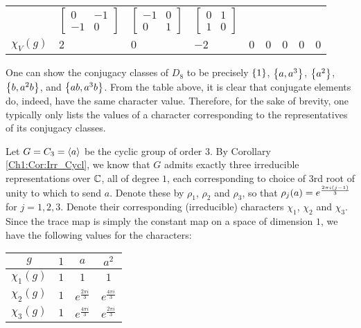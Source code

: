 \begin{boxexample}
\begin{table}[H]
\begin{tabular}{C{1.1cm}|C{1.1cm} C{1.38cm} C{1.67cm} C{1.38cm} C{1.38cm} C{1.67cm} C{1.38cm} C{1.1cm}}
            & \footnotesize
            $\begin{bmatrix} 0 & -1 \\ -1 & 0 \end{bmatrix}$
            & \footnotesize
            $\begin{bmatrix} -1 & 0 \\ 0 & 1 \end{bmatrix}$
            & \footnotesize
            $\begin{bmatrix} 0 & 1 \\ 1 & 0 \end{bmatrix}$
            \\
            $\chi_V(g)$ & $2$ & $0$ & $-2$ & $0$ & $0$ & $0$ & $0$ & $0$
        \end{tabular}
    \end{table}
\end{boxexample}

One can show the conjugacy classes of $D_8$ to be precisely $\left\{ 1 \right\}$, $\left\{ a, a^3 \right\}$, $\left\{ a^2 \right\}$, $\left\{ b, a^2 b \right\}$, and $\left\{ ab, a^3 b \right\}$. From the table above, it is clear that conjugate elements do, indeed, have the same character value. Therefore, for the sake of brevity, one typically only lists the values of a character corresponding to the representatives of its conjugacy classes.

\begin{boxexample}\label{Ch2:Eg:Cycl_3_Char}
    Let $G = C_3 = \left\langle a \right\rangle$ be the cyclic group of order $3$. By Corollary \ref{Ch1:Cor:Irr_Cycl}, we know that $G$ admits exactly three irreducible representations over $\mathbb{C}$, all of degree $1$, each corresponding to choice of $3$rd root of unity to which to send $a$. Denote these by $\rho_1$, $\rho_2$ and $\rho_3$, so that $\rho_j(a) = e^{\frac{2\pi i \left( j-1 \right)}{3}}$ for $j = 1, 2, 3$. Denote their corresponding (irreducible) characters $\chi_1$, $\chi_2$ and $\chi_3$. Since the trace map is simply the constant map on a space of dimension $1$, we have the following values for the characters:
    \begin{table}[H]
        \centering
        \begin{tabular}{c|ccc}
            $g$ & $1$ & $a$ & $a^2$ \\
            \hline
            $\chi_1(g)$ & $1$ & $1$ & $1$ \\
            $\chi_2(g)$ & $1$ & $e^{\frac{2\pi i}{3}}$ & $e^{\frac{4\pi i}{3}}$ \\
            $\chi_3(g)$ & $1$ & $e^{\frac{4\pi i}{3}}$ & $e^{\frac{2\pi i}{3}}$
        \end{tabular}
    \end{table}
\end{boxexample}

